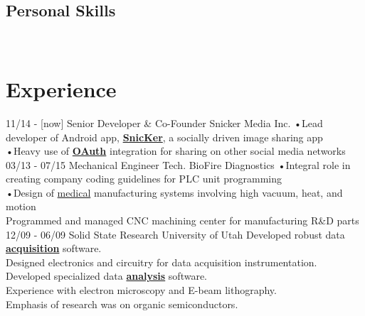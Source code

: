 \documentclass[]{friggeri-cv}
\begin{document}
\begin{aside}
	\section{Personal Skills}
	~
\end{aside}

\section{Experience}
\begin{entrylist}
	\entry
		{11/14 - [now]}
		{Senior Developer \& Co-Founder}
		{Snicker Media Inc.}
		{•Lead developer of Android app, \href{http://isnicker.com/}{\textbf{SnicKer}}, a socially driven image sharing app\\ 
		•Heavy use of \href{https://en.wikipedia.org/wiki/OAuth}{\textbf{OAuth}} integration for sharing on other social media networks\\ }
	\entry
		{03/13 - 07/15}
		{Mechanical Engineer Tech.}
		{BioFire Diagnostics}
		{•Integral role in creating company coding guidelines for PLC unit programming\\
		•Design of \href{http://www.biomerieux-diagnostics.com/filmarray-multiplex-pcr-system}{medical} manufacturing systems involving high vacuum, heat, and motion\\
		Programmed and managed CNC machining center for manufacturing R&D parts\\} 
	\entry
		{12/09 - 06/09}
		{Solid State Research}
		{University of Utah}
		{Developed robust data \href{http://www.ni.com/data-acquisition/what-is/}{\textbf{acquisition}} software.\\  
		Designed electronics and circuitry for data acquisition instrumentation.\\
		Developed specialized data \href{https://en.wikipedia.org/wiki/Data_analysis}{\textbf{analysis}} software.\\
		Experience with electron microscopy and E-beam lithography.\\  
		Emphasis of research was on organic semiconductors.}
\end{entrylist}
\end{document}
